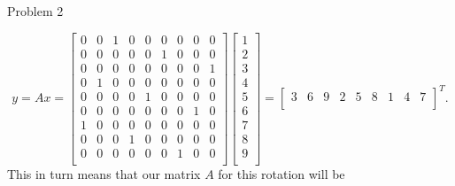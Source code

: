 \begin{problem}{Problem 2}
\begin{Highlight}
        \begin{equation}
            y = Ax = 
            \begin{bmatrix}
                0 & 0 & 1 & 0 & 0 & 0 & 0 & 0 & 0 \\
                0 & 0 & 0 & 0 & 0 & 1 & 0 & 0 & 0 \\
                0 & 0 & 0 & 0 & 0 & 0 & 0 & 0 & 1 \\
                0 & 1 & 0 & 0 & 0 & 0 & 0 & 0 & 0 \\
                0 & 0 & 0 & 0 & 1 & 0 & 0 & 0 & 0 \\
                0 & 0 & 0 & 0 & 0 & 0 & 0 & 1 & 0 \\
                1 & 0 & 0 & 0 & 0 & 0 & 0 & 0 & 0 \\
                0 & 0 & 0 & 1 & 0 & 0 & 0 & 0 & 0 \\
                0 & 0 & 0 & 0 & 0 & 0 & 1 & 0 & 0 \\
            \end{bmatrix}
            \begin{bmatrix}
                1 \\
                2 \\
                3 \\
                4 \\
                5 \\
                6 \\
                7 \\
                8 \\
                9 \\
            \end{bmatrix}
            = 
            \begin{bmatrix}
                3 & 6 & 9 & 2 & 5 & 8 & 1 & 4 & 7 \\
            \end{bmatrix}^{T}.
        \end{equation}
        This in turn means that our matrix $A$ for this rotation will be
        

\end{Highlight}
\end{problem}

